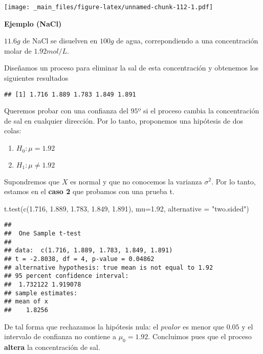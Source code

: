 \documentclass[
]{book}
\newenvironment{Shaded}{\begin{snugshade}}{\end{snugshade}}
\newcommand{\AttributeTok}[1]{\textcolor[rgb]{0.77,0.63,0.00}{#1}}
\newcommand{\FloatTok}[1]{\textcolor[rgb]{0.00,0.00,0.81}{#1}}
\newcommand{\FunctionTok}[1]{\textcolor[rgb]{0.00,0.00,0.00}{#1}}
\newcommand{\NormalTok}[1]{#1}
\newcommand{\StringTok}[1]{\textcolor[rgb]{0.31,0.60,0.02}{#1}}
\providecommand{\tightlist}{%
  \setlength{\itemsep}{0pt}\setlength{\parskip}{0pt}}
\begin{document}
\texttt{[image: \_main\_files/figure-latex/unnamed-chunk-112-1.pdf]}

\textbf{Ejemplo (NaCl)}

\(11.6 g\) de NaCl se disuelven en \(100 g\) de agua, correpondiendo a una concentración molar de \(1.92 mol/L\).

Diseñamos un proceso para eliminar la sal de esta concentración y obtenemos los siguientes resultados

\begin{verbatim}
## [1] 1.716 1.889 1.783 1.849 1.891
\end{verbatim}

Queremos probar con una confianza del \(95º%
\) si el proceso cambia la concentración de sal en cualquier dirección. Por lo tanto, proponemos una hipótesis de dos colas:

\begin{enumerate}
\def\labelenumi{\alph{enumi}.}
\tightlist
\item
  \(H_0:\mu=1.92\)
\item
  \(H_1:\mu\neq 1.92\)
\end{enumerate}

Supondremos que \(X\) es normal y que no conocemos la varianza \(\sigma^2\). Por lo tanto, estamos en el \textbf{caso 2} que probamos con una prueba t.

\begin{Shaded}
\begin{Highlighting}[]
\FunctionTok{t.test}\NormalTok{(}\FunctionTok{c}\NormalTok{(}\FloatTok{1.716}\NormalTok{, }\FloatTok{1.889}\NormalTok{, }\FloatTok{1.783}\NormalTok{, }\FloatTok{1.849}\NormalTok{, }\FloatTok{1.891}\NormalTok{), }
       \AttributeTok{mu=}\FloatTok{1.92}\NormalTok{, }\AttributeTok{alternative =} \StringTok{"two.sided"}\NormalTok{)}
\end{Highlighting}
\end{Shaded}

\begin{verbatim}
## 
##  One Sample t-test
## 
## data:  c(1.716, 1.889, 1.783, 1.849, 1.891)
## t = -2.8038, df = 4, p-value = 0.04862
## alternative hypothesis: true mean is not equal to 1.92
## 95 percent confidence interval:
##  1.732122 1.919078
## sample estimates:
## mean of x 
##    1.8256
\end{verbatim}

De tal forma que rechazamos la hipótesis nula: el \(pvalor\) es menor que \(0.05\) y el intervalo de confianza no contiene a \(\mu_0=1.92\). Concluimos pues que el proceso \textbf{altera} la concentración de sal.
\end{document}
